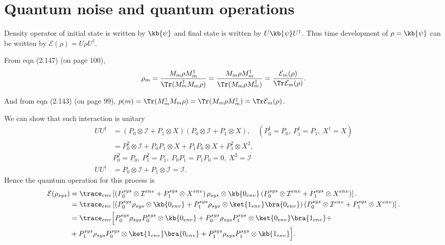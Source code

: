 \chapter{Quantum noise and quantum operations}
Density operator of initial state is written by $\kb{\psi}$ and final state is written by $U\kb{\psi}U^\dagger$.
Thus time development of $\rho = \kb{\psi}$ can be written by $\mathcal{E}(\rho) = U\rho U^\dagger$.

From eqn (2.147) (on page 100),
\begin{align*}
	\rho_m = \frac{M_m \rho M_m^\dagger}{\Tr (M_m^\dagger  M_m\rho ) }
					= \frac{M_m \rho M_m^\dagger}{\Tr ( M_m \rho M_m^\dagger ) }
					= \frac{\mathcal{E}_m (\rho)}{\Tr \mathcal{E}_m (\rho)}.
\end{align*}

And from eqn (2.143) (on page 99), $p(m) = \Tr (M_m^\dagger M_m \rho) = \Tr (M_m \rho M_m^\dagger) = \Tr \mathcal{E}_m (\rho)$.





	We can show that such interaction is unitary
		\begin{align*}
			UU^\dagger 
			&= \left( P_0 \otimes \mathcal{I} + P_1 \otimes X \right)\left( P_0 \otimes \mathcal{I} + P_1 \otimes X \right), \quad (P_0^\dagger = P_0,\ P_1^\dagger = P_1,\ X^\dagger = X)\\
			&= P_0^2 \otimes \mathcal{I} + P_0 P_1 \otimes X + P_1 P_0 \otimes X + P_1^2 \otimes X^2,\\
			& P_0^2 = P_0,\ P_1^2 = P_1,\ P_0 P_1 = P_1 P_0 = 0,\ X^2 = \mathcal{I}\\
			UU^\dagger &= P_0 \otimes \mathcal{I} + P_1 \otimes \mathcal{I} = \mathcal{I}.
		\end{align*}
	Hence the quantum operation for this process is
		\begin{align*}
			\mathcal{E}(\rho_{sys}) 
			&= \trace_{env}\left[ \left( P_0^{sys} \otimes \mathcal{I}^{env} + P_1^{sys} \otimes X^{env} \right) \rho_{sys} \otimes \kb{0_{env}} \left( P_0^{sys} \otimes \mathcal{I}^{env} + P_1^{sys} \otimes X^{env} \right) \right]. \\
			&= \trace_{env}\left[ \left( P_0^{sys}\rho_{sys} \otimes \kb{0_{env}} + P_1^{sys}\rho_{sys} \otimes \ket{1_{env}}\bra{0_{env}} \right)   \left( P_0^{sys} \otimes \mathcal{I}^{env} + P_1^{sys} \otimes X^{env} \right) \right]. \\
			&= \trace_{env}\Big[ P_0^{sys}\rho_{sys}P_0^{sys} \otimes \kb{0_{env}} + P_0^{sys}\rho_{sys}P_1^{sys} \otimes \ket{0_{env}}\bra{1_{env}} +\\
			&+  P_1^{sys}\rho_{sys}P_0^{sys} \otimes \ket{1_{env}}\bra{0_{env}} + P_1^{sys}\rho_{sys}P_1^{sys} \otimes \kb{1_{env}} \Big].
		\end{align*}

